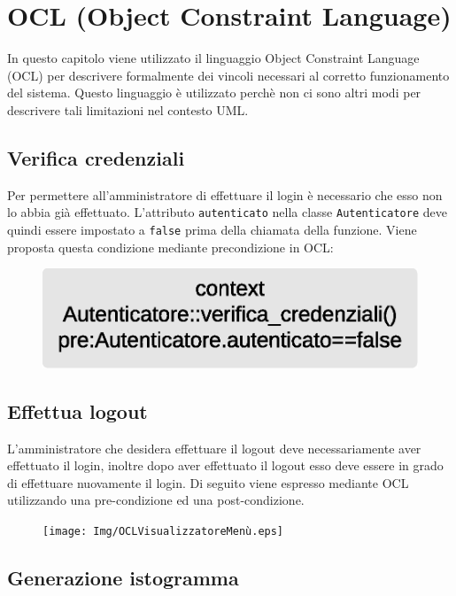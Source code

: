 \chapter{OCL (Object Constraint Language)}
In questo capitolo viene utilizzato il linguaggio Object Constraint Language (OCL) per descrivere formalmente dei vincoli necessari al corretto funzionamento del sistema. Questo linguaggio è utilizzato perchè non ci sono altri modi per descrivere tali limitazioni nel contesto UML.

\section{Verifica credenziali}

Per permettere all'amministratore di effettuare il login è necessario che esso non lo abbia già effettuato. L'attributo \texttt{autenticato} nella classe \texttt{Autenticatore} deve quindi essere impostato a \texttt{false} prima della chiamata della funzione. Viene proposta questa condizione mediante precondizione in OCL:

\begin{figure}[ht]
    \centering
    \includegraphics[scale=0.5]{Img/OCLAutenticatore.eps}
\end{figure}

\section{Effettua logout}

L'amministratore che desidera effettuare il logout deve necessariamente aver effettuato il login, inoltre dopo aver effettuato il logout esso deve essere in grado di effettuare nuovamente il login. Di seguito viene espresso mediante OCL utilizzando una pre-condizione ed una post-condizione.

\begin{figure}[ht]
    \centering
    \texttt{[image: Img/OCLVisualizzatoreMenù.eps]}
\end{figure}

\section{Generazione istogramma}

